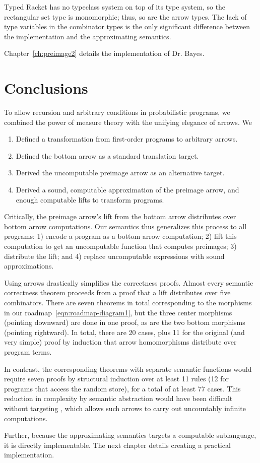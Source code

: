 Typed Racket has no typeclass system on top of its type system, so the rectangular set type is monomorphic; thus, so are the arrow types.
The lack of type variables in the combinator types is the only significant difference between the implementation and the approximating semantics.

Chapter~\ref{ch:preimage2} details the implementation of Dr. Bayes.

\section{Conclusions}

To allow recursion and arbitrary conditions in probabilistic programs, we combined the power of measure theory with the unifying elegance of arrows. We
\begin{enumerate}
	\item Defined a transformation from first-order programs to arbitrary arrows.
	\item Defined the bottom arrow as a standard translation target.
	\item Derived the uncomputable preimage arrow as an alternative target.
	\item Derived a sound, computable approximation of the preimage arrow, and enough computable lifts to transform programs.
\end{enumerate}
Critically, the preimage arrow's lift from the bottom arrow distributes over bottom arrow computations.
Our semantics thus generalizes this process to all programs: 1) encode a program as a bottom arrow computation; 2) lift this computation to get an uncomputable function that computes preimages; 3) distribute the lift; and 4) replace uncomputable expressions with sound approximations.

Using arrows drastically simplifies the correctness proofs.
Almost every semantic correctness theorem proceeds from a proof that a lift distributes over five combinators.
There are seven theorems in total corresponding to the morphisms in our roadmap~\eqref{eqn:roadmap-diagram1}, but the three center morphisms (pointing downward) are done in one proof, as are the two bottom morphisms (pointing rightward).
In total, there are 20 cases, plus 11 for the original (and very simple) proof by induction that arrow homomorphisms distribute over program terms.

In contrast, the corresponding theorems with separate semantic functions would require seven proofs by structural induction over at least 11 rules (12 for programs that access the random store), for a total of at least 77 cases. This reduction in complexity by semantic abstraction would have been difficult without targeting \lzfclang, which allows such arrows to carry out uncountably infinite computations.

Further, because the approximating semantics targets a computable \lzfclang sublanguage, it is directly implementable.
The next chapter details creating a practical implementation.

